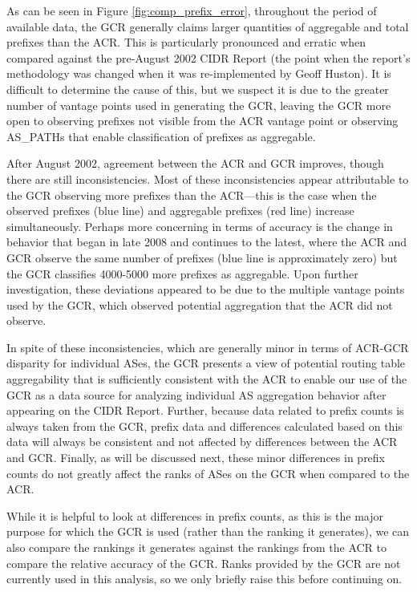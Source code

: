 As can be seen in Figure \ref{fig:comp_prefix_error}, throughout the period of
available data, the GCR generally claims larger quantities of aggregable and
total prefixes than the ACR. This is particularly pronounced and erratic when
compared against the pre-August 2002 CIDR Report (the point when the report's
methodology was changed when it was re-implemented by Geoff Huston). It is
difficult to determine the cause of this, but we suspect it is due to the
greater number of vantage points used in generating the GCR, leaving the GCR
more open to observing prefixes not visible from the ACR vantage point or
observing AS\_PATHs that enable classification of prefixes as aggregable.

After August 2002, agreement between the ACR and GCR improves, though there are
still inconsistencies. Most of these inconsistencies appear attributable to
the GCR observing more prefixes than the ACR---this is the case when the
observed prefixes (blue line) and aggregable prefixes (red line) increase
simultaneously. Perhaps more concerning in terms of accuracy is the change in
behavior that began in late 2008 and continues to the latest, where the ACR and
GCR observe the same number of prefixes (blue line is approximately zero) but
the GCR classifies 4000-5000 more prefixes as aggregable. Upon further
investigation, these deviations appeared to be due to the multiple vantage
points used by the GCR, which observed potential aggregation that the ACR did
not observe.

In spite of these inconsistencies, which are generally minor in terms of
ACR-GCR disparity for individual ASes, the GCR presents a view of potential
routing table aggregability that is sufficiently consistent with the ACR to
enable our use of the GCR as a data source for analyzing individual AS
aggregation behavior after appearing on the CIDR Report. Further, because data
related to prefix counts is always taken from the GCR, prefix data and
differences calculated based on this data will always be consistent and not
affected by differences between the ACR and GCR. Finally, as will be discussed
next, these minor differences in prefix counts do not greatly affect the ranks
of ASes on the GCR when compared to the ACR.

While it is helpful to look at differences in prefix counts, as this is the
major purpose for which the GCR is used (rather than the ranking it generates),
we can also compare the rankings it generates against the rankings from the ACR
to compare the relative accuracy of the GCR. Ranks provided by the GCR are not
currently used in this analysis, so we only briefly raise this before continuing
on.

